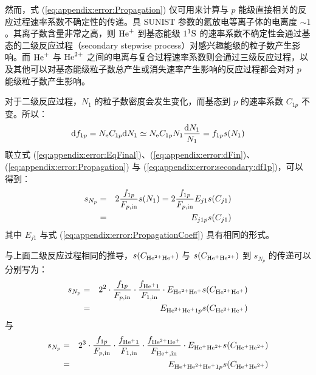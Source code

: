 然而，式 (\ref{eq:appendix:error:Propagation}) 仅可用来计算与 $p$ 能级直接相关的反应过程速率系数不确定性的传递。具 SUNIST 参数的氦放电等离子体的电离度 $\sim 1$。其离子数含量非常之高，则 ${\rm He}^+$ 到基态能级 $1^1{\rm S}$ 的速率系数不确定性会通过基态的二级反应过程（secondary stepwise process）对感兴趣能级的粒子数产生影响。而 ${\rm He}^+$ 与 ${\rm He}^{2+}$ 之间的电离与复合过程速率系数则会通过三级反应过程，以及其他可以对基态能级粒子数总产生或消失速率产生影响的反应过程都会对对 $p$ 能级粒子数产生影响。

对于二级反应过程，$N_1$ 的粒子数密度会发生变化，而基态到 $p$ 的速率系数 $C_{1p}$ 不变。所以：
\begin{eqnarray}
{\rm d}f_{1p}=N_{\rm e}C_{1p}{\rm d}N_1\simeq N_{\rm e}C_{1p}N_1\frac{{\rm d}N_1}{N_1}=f_{1p}s(N_1)
\label{eq:appendix:error:secondary:df1p}
\end{eqnarray}
联立式 (\ref{eq:appendix:error:EqFinal})、(\ref{eq:appendix:error:dFin})、(\ref{eq:appendix:error:Propagation}) 与 (\ref{eq:appendix:error:secondary:df1p})，可以得到：
\begin{eqnarray}
s_{N_p}&=&2\frac{f_{1p}}{F_{p,{\rm in}}}s(N_1)
=2\frac{f_{1p}}{F_{p,{\rm in}}}E_{j1}s(C_{j1})\nonumber \\
&=&E_{j1p}s(C_{j1})
\label{eq:appendix:error:secondary:sigmaNp}
\end{eqnarray}
其中 $E_{j1}$ 与式 (\ref{eq:appendix:error:PropagationCoeff}) 具有相同的形式。

与上面二级反应过程相同的推导，$s(C_{{\rm He}^{2+}{\rm He}^+})$ 与 $s(C_{{\rm He}^+{\rm He}^{2+}})$ 到 $s_{N_p}$ 的传递可以分别写为：
\begin{eqnarray}
s_{N_p}&=&2^2\cdot\frac{f_{1p}}{F_{p,{\rm in}}}%
\cdot
\frac{f_{{\rm He}^+1}}{F_{1,{\rm in}}}
\cdot
E_{{\rm He}^{2+}{\rm He}^+}s(C_{{\rm He}^{2+}{\rm He}^+})\nonumber\\
&=&E_{{\rm He}^{2+}{\rm He}^+1p}s(C_{{\rm He}^{2+}{\rm He}^+})
\label{eq:appendix:error:HeII:sigmaNp}
\end{eqnarray}
与
\begin{eqnarray}
s_{N_p}&=&2^3\cdot\frac{f_{1p}}{F_{p,{\rm in}}}%
\cdot
\frac{f_{{\rm He}^+1}}{F_{1,{\rm in}}}
\cdot
\frac{f_{{\rm He}^{2+}{\rm He}^+}}{F_{{\rm He}^+,{\rm in}}}
\cdot
E_{{\rm He}^+{\rm He}^{2+}}s(C_{{\rm He}^+{\rm He}^{2+}})\nonumber\\
&=&E_{{\rm He}^+{\rm He}^{2+}{\rm He}^+1p}s(C_{{\rm He}^+{\rm He}^{2+}})
\label{eq:appendix:error:HeIII:sigmaNp}
\end{eqnarray}


